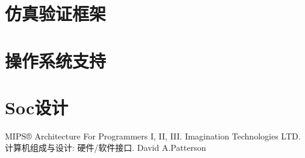 \documentclass[black,normal,cn,hide]{elegantbook}
\begin{document}
\chapter{仿真验证框架}
\chapter{操作系统支持}
\chapter{Soc设计}



\newpage
\renewcommand{\bibname}{参考文献}
\begin{thebibliography}{99}
	 MIPS® Architecture For Programmers I, II, III. Imagination Technologies LTD.  
   计算机组成与设计: 硬件/软件接口. David A.Patterson
\end{thebibliography}
\end{document}

